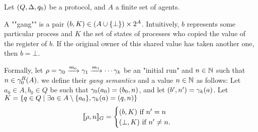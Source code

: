 \begin{definition}
	Let $(Q,\Delta, q_0)$ be a protocol, and $A$ a finite set of agents.
	
	A ""gang"" is a pair $(b, K) \in (A \cup \{\bot\}) \times 2^{A}$.
	Intuitively, $b$ represents some particular process and $K$ the set of states of processes who copied the value of the register of $b$. If the original owner of this shared value has taken another one, then $b = \bot$.
	
	Formally, let $\rho = \gamma_0 \xrightarrow{m_0} \gamma_1 \xrightarrow{m_1} \cdots \gamma_k$ be an "initial run" and $n \in \mathbb{N}$ such that $n \in \gamma_0^R(A)$.
	we define their \emph{gang semantics} and a value $n \in \mathbb{N}$ as follows:
	Let $a_0 \in A, b_0 \in Q$ be such that $\gamma_0(a_0) = (b_0,n)$, and let $(b', n') = \gamma_k(a)$.
	Let $K = \{q \in Q \mid \exists a \in A\setminus \{a_0\}, \gamma_k(a) = (q,n)\}$
	\[
		[\![\rho,n]\!]_G= 
		\begin{cases}
			(b,K) \text{ if } n'=n\\
			(\bot, K) \text{ if } n'\neq n.
		\end{cases} 
	\]
\end{definition} 
 